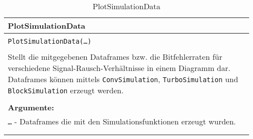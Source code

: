 \begin{longtable}{|p{\textwidth}|}
\hline
\rowcolor{lightblue}
PlotSimulationData
\\
\hline
\\
\texttt{PlotSimulationData(\dots)}\\
\\
Stellt die mitgegebenen Dataframes bzw. die Bitfehlerraten für verschiedene Signal-Rausch-Verhältnisse in einem Diagramm dar. Dataframes können mittels \texttt{ConvSimulation}, \texttt{TurboSimulation} und \texttt{BlockSimulation} erzeugt werden.\\
\\
\textbf{Argumente:}\\
\texttt{\dots} - Dataframes die mit den Simulationsfunktionen erzeugt wurden.\\	
\\
\hline
\caption{PlotSimulationData}
\end{longtable}